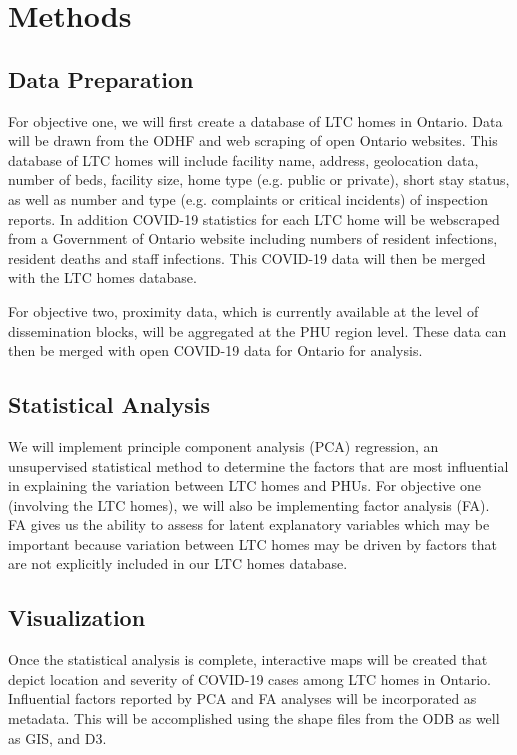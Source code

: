 \documentclass{article}
\begin{document}
\section{Methods}
\subsection{Data Preparation}

For objective one, we will first create a database of LTC homes in Ontario. Data will be drawn from the ODHF and web scraping of open Ontario websites. This database of LTC homes will include facility name, address, geolocation data, number of beds, facility size, home type (e.g. public or private), short stay status, as well as number and type (e.g. complaints or critical incidents) of inspection reports. In addition COVID-19 statistics for each LTC home will be webscraped from a Government of Ontario website including numbers of resident infections, resident deaths and staff infections. This COVID-19 data will then be merged with the LTC homes database. 

For objective two, proximity data, which is currently available at the level of dissemination blocks, will be aggregated at the PHU region level. These data can then be merged with open COVID-19 data for Ontario for analysis. 


\subsection{Statistical Analysis}
We will implement principle component analysis (PCA) regression, an unsupervised statistical method to determine the factors that are most influential in explaining the variation between LTC homes and PHUs. For objective one (involving the LTC homes), we will also be implementing factor analysis (FA). FA gives us the ability to assess for latent explanatory variables which may be important because variation between LTC homes may be driven by factors that are not explicitly included in our LTC homes database. 

\subsection{Visualization}
Once the statistical analysis is complete, interactive maps will be created that depict location and severity of COVID-19 cases among LTC homes in Ontario. Influential factors reported by PCA and FA analyses will be incorporated as metadata. This will be accomplished using the shape files from the ODB as well as GIS, and D3. 
\end{document}
